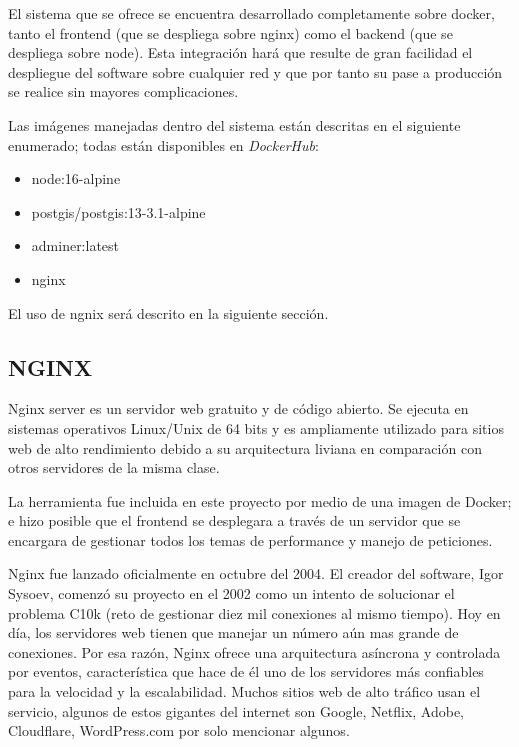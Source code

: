 El sistema que se ofrece se encuentra desarrollado completamente sobre docker, tanto el frontend (que se despliega sobre nginx) como el backend (que se despliega sobre node). Esta integración hará que resulte de gran facilidad el despliegue del software sobre cualquier red y que por tanto su pase a producción se realice sin mayores complicaciones. 

Las imágenes manejadas dentro del sistema están descritas en el siguiente enumerado; todas están disponibles en \textit{DockerHub}:
\begin{itemize}
	\item node:16-alpine
	\item postgis/postgis:13-3.1-alpine
	\item adminer:latest
	\item nginx
\end{itemize}

El uso de ngnix será descrito en la siguiente sección.

\subsection{NGINX}

Nginx server es un servidor web gratuito y de código abierto. Se ejecuta en sistemas operativos Linux/Unix de 64 bits y es ampliamente utilizado para sitios web de alto rendimiento debido a su arquitectura liviana en comparación con otros servidores de la misma clase.

La herramienta fue incluida en este proyecto por medio de una imagen de Docker; e hizo posible que el frontend se desplegara a través de un servidor que se encargara de gestionar todos los temas de performance y manejo de peticiones.

Nginx fue lanzado oficialmente en octubre del 2004. El creador del software, Igor Sysoev, comenzó su proyecto en el 2002 como un intento de solucionar el problema C10k (reto de gestionar diez mil conexiones al mismo tiempo). Hoy en día, los servidores web tienen que manejar un número aún mas grande de conexiones. Por esa razón, Nginx ofrece una arquitectura asíncrona y controlada por eventos, característica que hace de él uno de los servidores más confiables para la velocidad y la escalabilidad. Muchos sitios web de alto tráfico usan el servicio, algunos de estos gigantes del internet son Google, Netflix, Adobe, Cloudflare, WordPress.com por solo mencionar algunos. \cite{nginx}





